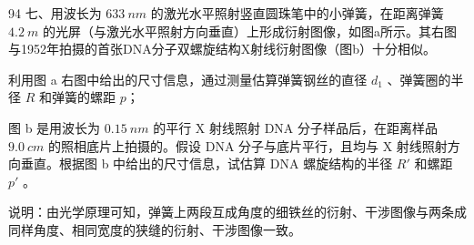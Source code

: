 \begin{problem}[第35届全国中学生物理竞赛复赛][X射线衍射与DNA结构]{94}
七、用波长为 $633\ nm$ 的激光水平照射竖直圆珠笔中的小弹簧，在距离弹簧 $4.2\ m$ 的光屏（与激光水平照射方向垂直）上形成衍射图像，如图a所示。其右图与1952年拍摄的首张DNA分子双螺旋结构X射线衍射图像（图b）十分相似。
\begin{subproblem}
利用图 a 右图中给出的尺寸信息，通过测量估算弹簧钢丝的直径 $d_{1}$ 、弹簧圈的半径 $R$ 和弹簧的螺距 $p$；
\end{subproblem}
\begin{subproblem}
图 b 是用波长为 $0.15\ nm$ 的平行 X 射线照射 DNA 分子样品后，在距离样品 $9.0\ cm$ 的照相底片上拍摄的。假设 DNA 分子与底片平行，且均与 X 射线照射方向垂直。根据图 b 中给出的尺寸信息，试估算 DNA 螺旋结构的半径 $R'$ 和螺距 $p'$ 。

说明：由光学原理可知，弹簧上两段互成角度的细铁丝的衍射、干涉图像与两条成同样角度、相同宽度的狭缝的衍射、干涉图像一致。
\end{subproblem}
\end{problem}

